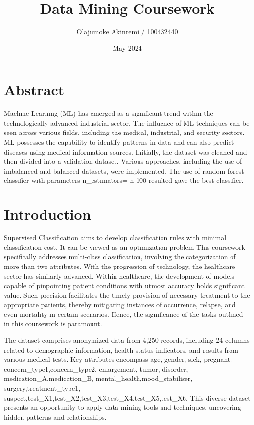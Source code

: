 \documentclass[a4paper]{article}
\begin{document}
\title{Data Mining Coursework}
\author{Olajumoke Akinremi / 100432440}
\date{May 2024} %
\maketitle

\section*{Abstract}
Machine Learning (ML) has emerged as a significant trend within the technologically advanced industrial sector. The influence of ML techniques can be seen across various fields, including the medical, industrial, and security sectors. ML possesses the capability to identify patterns in data and can also predict diseases using medical information sources\citep{tumpa2022review}. Initially, the dataset was cleaned and then divided into a validation dataset. Various approaches, including the use of imbalanced and balanced datasets, were implemented. The use of random forest classifier with parameters n\_estimators= n 100 resulted gave the best classifier. 


\section{Introduction} \label{intro}

Supervised Classification aims to develop classification rules with minimal classification cost. It can be viewed as an optimization problem \citep{silva2017optimization}
 This coursework specifically addresses multi-class classification, involving the categorization of more than two attributes. With the progression of technology, the healthcare sector has similarly advanced. Within healthcare, the development of models capable of pinpointing patient conditions with utmost accuracy holds significant value. Such precision facilitates the timely provision of necessary treatment to the appropriate patients, thereby mitigating instances of occurrence, relapse, and even mortality in certain scenarios. Hence, the significance of the tasks outlined in this coursework is paramount. 

The dataset comprises anonymized data from 4,250 records, including 24 columns related to demographic information, health status indicators, and results from various medical tests. Key attributes encompass age, gender, sick, pregnant, concern\_type1,concern\_type2, enlargement, tumor, disorder, medication\_A,medication\_B, mental\_health,mood\_stabiliser, surgery,treatment\_type1, suspect,test\_X1,test\_X2,test\_X3,test\_X4,test\_X5,test\_X6. This diverse dataset presents an opportunity to apply data mining tools and techniques, uncovering hidden patterns and relationships.
\end{document}
